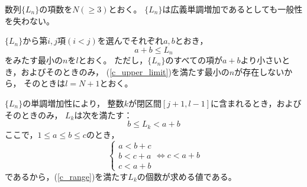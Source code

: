 \documentclass{article}
\begin{document}
数列$\{L_n\}$の項数を$N (\geq 3)$とおく。
$\{L_n\}$は広義単調増加であるとしても一般性を失わない。

$\{L_n\}$から第$i, j$項$(i < j)$を選んでそれぞれ$a, b$とおき，
\begin{equation}
    \label{c_upper_limit}
    a + b \leq L_n
\end{equation}
をみたす最小の$n$を$l$とおく。
ただし，$\{L_n\}$のすべての項が$a + b$より小さいとき，およびそのときのみ，
(\ref{c_upper_limit})を満たす最小の$n$が存在しないから，
そのときは$l = N + 1$とおく。

$\{L_n\}$の単調増加性により，
整数$k$が閉区間$[j + 1, l - 1]$に含まれるとき，およびそのときのみ，
$L_k$は次を満たす：
\begin{equation}
    \label{c_range}
    b \leq L_k < a + b
\end{equation}
ここで，$1 \leq a \leq b \leq c$のとき，
\begin{equation}
    \label{a}
    \begin{cases}
        a < b + c \\
        b < c + a \\
        c < a + b
    \end{cases}
    \Longleftrightarrow
    c < a + b
\end{equation}
であるから，(\ref{c_range})を満たす$L_k$の個数が求める値である。

\end{document}

